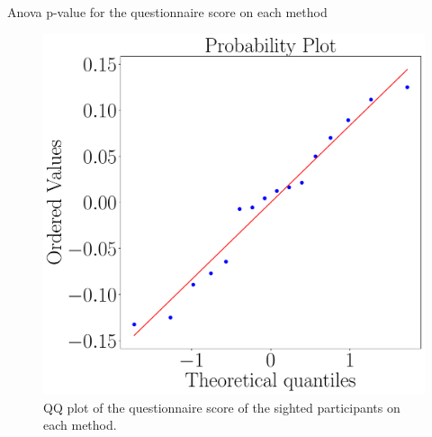 \begin{table}
    \caption{Anova p-value for the questionnaire score on each method}
    \label{tab:blocanova_questionnaire_blind_sight}
\begin{minipage}{0.45\textwidth}
    
\end{minipage}
\begin{minipage}{0.45\textwidth}
    
\end{minipage}
\end{table}

\begin{figure}[!htb]
    \centering
    \begin{minipage}{0.45\textwidth}
        \centering
        \includegraphics[width = 0.8\linewidth]{Resultados/Questionario/Figuras/pdf/qqplot_questionnaire_sight.pdf}
        \caption{QQ plot of the questionnaire score of the sighted participants on each method.}
        \label{fig:qqplot_questionnaire_sight}
    \end{minipage}
    \begin{minipage}{0.075\textwidth}
        \hfill
    \end{minipage}
    \begin{minipage}{0.45\textwidth}
        \centering

\end{minipage}
\end{figure}
